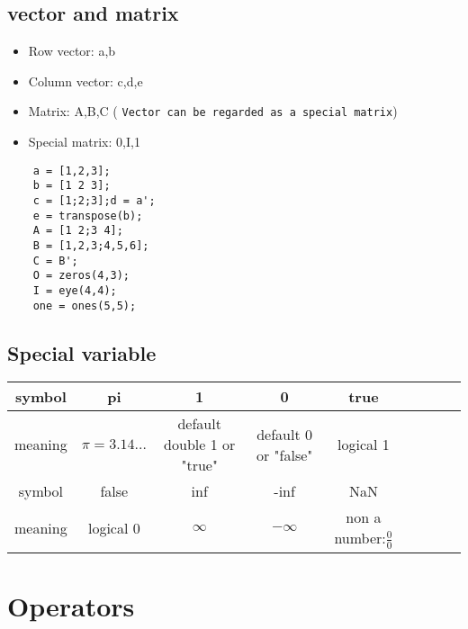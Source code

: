 \documentclass{article}
\begin{document}
\subsection{vector and matrix}
 
      \begin{itemize}
        \item   Row vector:  a,b
              
        \item Column vector: c,d,e
              
        \item Matrix: A,B,C ({\color{red} \small \tt Vector can be regarded as a special matrix})
        \item Special matrix: 0,I,1
      \end{itemize}
\begin{lstlisting}
    a = [1,2,3];
    b = [1 2 3];
    c = [1;2;3];d = a';
    e = transpose(b);
    A = [1 2;3 4];
    B = [1,2,3;4,5,6];
    C = B';
    O = zeros(4,3);
    I = eye(4,4);
    one = ones(5,5);
\end{lstlisting}
   
\subsection{Special variable}
  \begin{table}[H]
    \centering
    \tiny
    \begin{tabular}{ccccccccc}\toprule
      symbol &pi&1&0&true\\\midrule
      meaning& $\pi=3.14\ldots$&default double 1 or "true"& default 0 or "false"& logical 1\\\midrule
     symbol &false& inf& -inf & NaN\\\midrule
     meaning&logical 0 &$\infty$&$-\infty$&non a number:$\frac{0}{0}$\\\bottomrule
    \end{tabular}
  \end{table}

\section{Operators}
\end{document}
